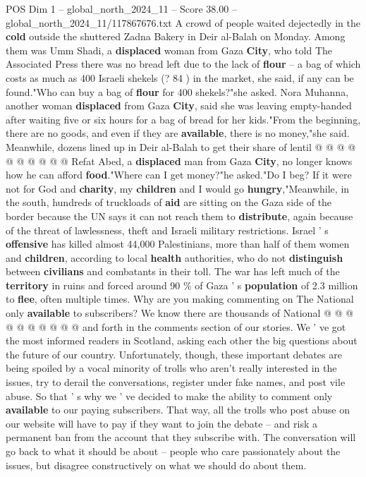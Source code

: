 \begin{textsample}{POS Dim 1 – global\_north\_2024\_11 – Score 38.00 – global\_north\_2024\_11/117867676.txt}
A crowd of people waited dejectedly in the \textbf{cold} outside the shuttered Zadna Bakery in Deir al-Balah on Monday.
Among them was Umm Shadi, a \textbf{displaced} woman from Gaza \textbf{City}, who told The Associated Press there was no bread left due to the lack of \textbf{flour} -- a bag of which costs as much as 400 Israeli shekels (? 84 ) in the market, she said, if any can be found."Who can buy a bag of \textbf{flour} for 400 shekels?"she asked.
Nora Muhanna, another woman \textbf{displaced} from Gaza \textbf{City}, said she was leaving empty-handed after waiting five or six hours for a bag of bread for her kids."From the beginning, there are no goods, and even if they are \textbf{available}, there is no money,"she said.
Meanwhile, dozens lined up in Deir al-Balah to get their share of lentil @ @ @ @ @ @ @ @ @ @ Refat Abed, a \textbf{displaced} man from Gaza \textbf{City}, no longer knows how he can afford \textbf{food}."Where can I get money?"he asked."Do I beg?
If it were not for God and \textbf{charity}, my \textbf{children} and I would go \textbf{hungry},"Meanwhile, in the south, hundreds of truckloads of \textbf{aid} are sitting on the Gaza side of the border because the UN says it can not reach them to \textbf{distribute}, again because of the threat of lawlessness, theft and Israeli military restrictions.
Israel ' s \textbf{offensive} has killed almost 44,000 Palestinians, more than half of them women and \textbf{children}, according to local \textbf{health} authorities, who do not \textbf{distinguish} between \textbf{civilians} and combatants in their toll.
The war has left much of the \textbf{territory} in ruins and forced around 90 \% of Gaza ' s \textbf{population} of 2.3 million to \textbf{flee}, often multiple times.
Why are you making commenting on The National only \textbf{available} to subscribers?
We know there are thousands of National @ @ @ @ @ @ @ @ @ @ and forth in the comments section of our stories.
We ' ve got the most informed readers in Scotland, asking each other the big questions about the future of our country.
Unfortunately, though, these important debates are being spoiled by a vocal minority of trolls who aren't really interested in the issues, try to derail the conversations, register under fake names, and post vile abuse.
So that ' s why we ' ve decided to make the ability to comment only \textbf{available} to our paying subscribers.
That way, all the trolls who post abuse on our website will have to pay if they want to join the debate -- and risk a permanent ban from the account that they subscribe with.
The conversation will go back to what it should be about -- people who care passionately about the issues, but disagree constructively on what we should do about them.

\end{textsample}

